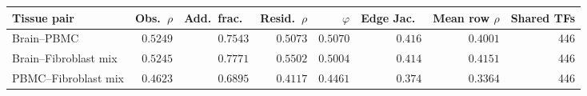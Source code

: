 \begin{tabular}{lrrrrrrr}
\toprule
Tissue pair & Obs.\ $\rho$ & Add.\ frac.\ & Resid.\ $\rho$ & $\varphi$ & Edge Jac.\ & Mean row $\rho$ & Shared TFs \\ 
\midrule
Brain--PBMC & $0.5249$ & $0.7543$ & $0.5073$ & $0.5070$ & $0.416$ & $0.4001$ & 446 \\
Brain--Fibroblast mix & $0.5245$ & $0.7771$ & $0.5502$ & $0.5004$ & $0.414$ & $0.4151$ & 446 \\
PBMC--Fibroblast mix & $0.4623$ & $0.6895$ & $0.4117$ & $0.4461$ & $0.374$ & $0.3364$ & 446 \\
\bottomrule
\end{tabular}
